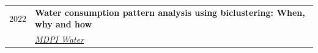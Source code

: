 \documentclass[a4paper,10pt]{article}
\begin{document}
\begin{tabularx}{\linewidth}{r|X}
\textsc{2022} & {\small\textbf{Water consumption pattern analysis using biclustering: When, why and how}} \\
 & \href{https://www.mdpi.com/2073-4441/14/12/1954}{\textit{MDPI Water}} \\

\end{tabularx}
  










  
  


\end{document}

